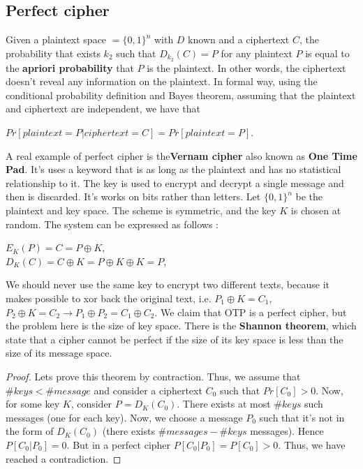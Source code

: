 \documentclass[11pt]{article}
\begin{document}
\subsection{Perfect cipher}
Given a plaintext space $= \{0,1\}^{n}$ with $D$ known and a ciphertext $C$, the probability that exists $k_2$ such that $D_{k_2}(C) = P$ for any plaintext $P$ is equal to the \textbf{apriori probability} that $P$ is the plaintext. In other words, the ciphertext doesn't reveal any information on the plaintext. In formal way, using the conditional probability definition and Bayes theorem, assuming that the plaintext and ciphertext are independent, we have that
\begin{center}
$Pr[plaintext = P | ciphertext = C] = Pr[plaintext = P]$.
\end{center}
A real example of perfect cipher is the\textbf{Vernam cipher} also known as \textbf{One Time Pad}. It's uses a keyword that is as long as the plaintext and has no statistical relationship to it. The key is used to encrypt and decrypt a single message and then is discarded. It's works on bits rather than letters. Let $\{0, 1\}^{n}$ be the plaintext and key space. The scheme is symmetric, and the key $K$ is chosen at random. The system can be expressed as follows :
\begin{center}
$E_{K}(P) = C = P \oplus K$,\\$D_{K}(C) = C \oplus K = P \oplus K \oplus K = P$,
\end{center}
We should never use the same key to encrypt two different texts, because it makes possible to xor back the original text, i.e. $P_1 \oplus K = C_1$, $P_2 \oplus K = C_2 \rightarrow P_1 \oplus P_2 = C_1 \oplus C_2$. We claim that OTP is a perfect cipher, but the problem here is the size of key space. There is the \textbf{Shannon theorem}, which state that a cipher cannot be perfect if the size of its key space is less than the size of its message space.
\begin{proof}
Lets prove this theorem by contraction. Thus, we assume that $\#keys < \#message$ and consider a ciphertext $C_0$ such that $Pr[C_0] > 0$. Now, for some key $K$, consider $P = D_{K}(C_0)$. There exists at most $\#keys$ such messages (one for each key). Now, we choose a message $P_0$ such that it's not in the form of $D_{K}(C_0)$ (there exists $\#messages - \#keys$ messages). Hence $P[C_0 | P_0] = 0$. But in a perfect cipher $P[C_0 | P_0] = P[C_0] > 0$. Thus, we have reached a contradiction.
\end{proof}
\end{document}

